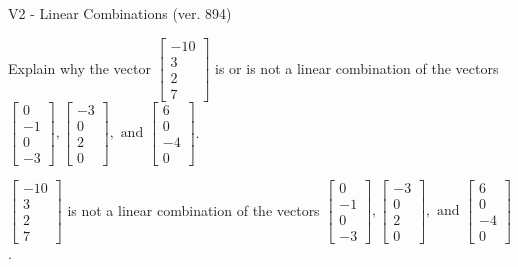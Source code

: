 \begin{exercise}
  \begin{exerciseTitle}V2 - Linear Combinations (ver. 894)\end{exerciseTitle}
  \begin{exerciseStatement}
    Explain why the vector \(\left[\begin{array}{c}
-10 \\
3 \\
2 \\
7
\end{array}\right]\)  is or is not a linear 
	combination of the vectors \(\left[\begin{array}{c}
0 \\
-1 \\
0 \\
-3
\end{array}\right] , \left[\begin{array}{c}
-3 \\
0 \\
2 \\
0
\end{array}\right] , \text{ and } \left[\begin{array}{c}
6 \\
0 \\
-4 \\
0
\end{array}\right]\).
	


  \end{exerciseStatement}
  \begin{exerciseAnswer}
   \(\left[\begin{array}{c}
-10 \\
3 \\
2 \\
7
\end{array}\right]\) 
  	 is not  
	a linear combination of the vectors \(\left[\begin{array}{c}
0 \\
-1 \\
0 \\
-3
\end{array}\right] , \left[\begin{array}{c}
-3 \\
0 \\
2 \\
0
\end{array}\right] , \text{ and } \left[\begin{array}{c}
6 \\
0 \\
-4 \\
0
\end{array}\right]\).

	
  


  \end{exerciseAnswer}
\end{exercise}